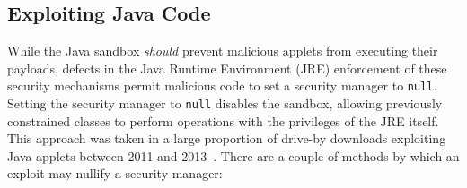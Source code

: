 \documentclass{sig-alternate}
\begin{document}
\subsection{Exploiting Java Code}
 \label{sec:Java-Exploits}

%
While the Java sandbox \textit{should} prevent malicious applets from
executing their payloads, defects in the
Java Runtime Environment (JRE) enforcement of these security mechanisms permit
malicious code to set a security manager to \texttt{null}.  
Setting the security manager to \texttt{null} disables the sandbox, allowing
previously constrained classes to perform operations with the privileges of 
the JRE itself. 
This approach was taken in a large proportion of drive-by downloads exploiting
Java applets between 2011 and 2013~\cite{fixme-metasploit}. 
%
There are a couple of methods by which an exploit may nullify a security manager:
\end{document}
